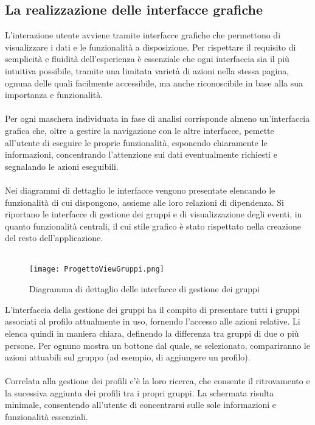 \subsection{La realizzazione delle interfacce grafiche}
L'interazione utente avviene tramite interfacce grafiche 
che permettono di visualizzare i dati e le funzionalità a disposizione. 
Per rispettare il requisito di semplicità e fluidità dell'esperienza è essenziale che 
ogni interfaccia sia il più intuitiva possibile, tramite una limitata varietà di azioni nella stessa pagina,
ognuna delle quali facilmente accessibile, ma anche riconoscibile in base alla sua importanza e funzionalità.\\
\\
Per ogni maschera individuata in fase di analisi corrisponde almeno un'interfaccia grafica che, 
oltre a gestire la navigazione con le altre interfacce, 
pemette all'utente di eseguire le proprie funzionalità,
esponendo chiaramente le informazioni,
concentrando l'attenzione sui dati eventualmente richiesti e segnalando le azioni eseguibili.\\
\\
Nei diagrammi di dettaglio le interfacce vengono presentate elencando le funzionalità di cui dispongono, 
assieme alle loro relazioni di dipendenza.
Si riportano le interfacce di gestione dei gruppi e di visualizzazione degli eventi, 
in quanto funzionalità centrali, il cui stile grafico è stato rispettato nella creazione del resto dell'applicazione.\\
\\
\begin{figure}[htbp]
    \begin{center}
        \texttt{[image: ProgettoViewGruppi.png]}
        \caption{Diagramma di dettaglio delle interfacce di gestione dei gruppi}
    \end{center}
\end{figure}
\clearpage
L'interfaccia della gestione dei gruppi ha il compito di presentare tutti i gruppi associati al profilo attualmente in uso,
fornendo l'accesso alle azioni relative. 
Li elenca quindi in maniera chiara, definendo la differenza tra gruppi di due o più persone.
Per ognuno mostra un bottone dal quale, se selezionato, compariranno le azioni attuabili sul gruppo 
(ad esempio, di aggiungere un profilo).\\
\\
Correlata alla gestione dei profili c'è la loro ricerca, 
che consente il ritrovamento e la sucessiva aggiunta dei profili tra i propri gruppi.
La schermata risulta minimale, consentendo all'utente di concentrarsi sulle sole informazioni e funzionalità essenziali.\\
\\


